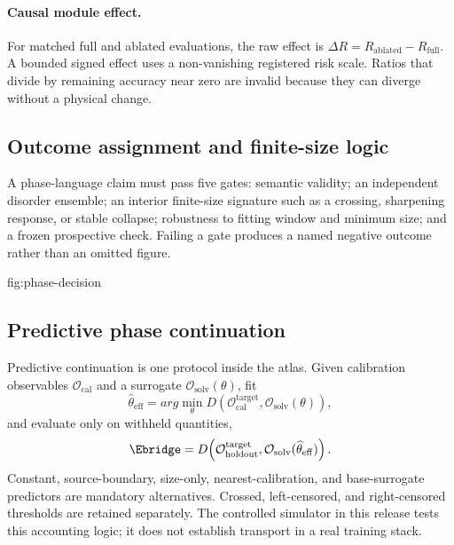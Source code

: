 \paragraph{Causal module effect.}
For matched full and ablated evaluations, the raw effect is
$\Delta R=R_{\mathrm{ablated}}-R_{\mathrm{full}}$. A bounded signed effect uses a
non-vanishing registered risk scale. Ratios that divide by remaining accuracy
near zero are invalid because they can diverge without a physical change.

\subsection{Outcome assignment and finite-size logic}

A phase-language claim must pass five gates: semantic validity; an independent
disorder ensemble; an interior finite-size signature such as a crossing,
sharpening response, or stable collapse; robustness to fitting window and
minimum size; and a frozen prospective check. Failing a gate produces a named
negative outcome rather than an omitted figure.

{fig:phase-decision}

\subsection{Predictive phase continuation}

Predictive continuation is one protocol inside the atlas. Given calibration
observables $\mathcal O_{\mathrm{cal}}$ and a surrogate
$\mathcal O_{\mathrm{solv}}(\theta)$, fit
\begin{equation}
  \widehat\theta_{\mathrm{eff}}=arg\min_{\theta}
  D\!\left(\mathcal O_{\mathrm{cal}}^{\mathrm{target}},
  \mathcal O_{\mathrm{solv}}(\theta)\right),
\end{equation}
and evaluate only on withheld quantities,
\begin{equation}
  \Ebridge=D\!\left(\mathcal O_{\mathrm{holdout}}^{\mathrm{target}},
  \mathcal O_{\mathrm{solv}}(\widehat\theta_{\mathrm{eff}})\right).
\end{equation}
Constant, source-boundary, size-only, nearest-calibration, and base-surrogate
predictors are mandatory alternatives. Crossed, left-censored, and
right-censored thresholds are retained separately. The controlled simulator in
this release tests this accounting logic; it does not establish transport in a
real training stack.

\FloatBarrier
